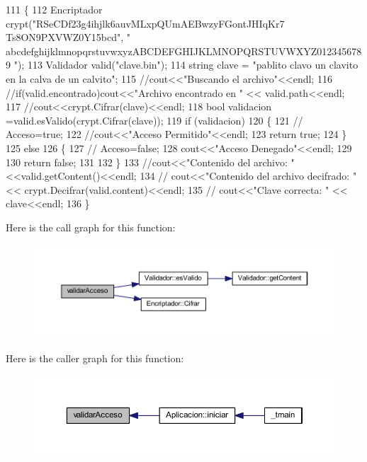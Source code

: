 \begin{DoxyCode}
111 \{
112     Encriptador crypt(\textcolor{stringliteral}{"RSeCDf23g4ihjlk6auvMLxpQUmAEBwzyFGontJHIqKr7 Ts8ON9PXVWZ0Y15bcd"}, \textcolor{stringliteral}{"
      abcdefghijklmnopqrstuvwxyzABCDEFGHIJKLMNOPQRSTUVWXYZ0123456789 "});
113     Validador valid(\textcolor{stringliteral}{"clave.bin"});
114     \textcolor{keywordtype}{string} clave = \textcolor{stringliteral}{"pablito clavo un clavito en la calva de un calvito"};
115     \textcolor{comment}{//cout<<"Buscando el archivo"<<endl;}
116     \textcolor{comment}{//if(valid.encontrado)cout<<"Archivo encontrado en " << valid.path<<endl;}
117     \textcolor{comment}{//cout<<crypt.Cifrar(clave)<<endl;}
118     \textcolor{keywordtype}{bool} validacion =valid.esValido(crypt.Cifrar(clave));
119     \textcolor{keywordflow}{if} (validacion)
120     \{
121         \textcolor{comment}{//      Acceso=true;}
122         \textcolor{comment}{//cout<<"Acceso Permitido"<<endl;}
123         \textcolor{keywordflow}{return} \textcolor{keyword}{true};
124     \}
125     \textcolor{keywordflow}{else}
126     \{
127         \textcolor{comment}{//      Acceso=false;}
128         cout<<\textcolor{stringliteral}{"Acceso Denegado"}<<endl;
129 
130         \textcolor{keywordflow}{return} \textcolor{keyword}{false};
131 
132     \}
133     \textcolor{comment}{//cout<<"Contenido del archivo: "<<valid.getContent()<<endl;}
134     \textcolor{comment}{//  cout<<"Contenido del archivo decifrado: " << crypt.Decifrar(valid.content)<<endl;}
135     \textcolor{comment}{//  cout<<"Clave correcta: " << clave<<endl;}
136 \}
\end{DoxyCode}


Here is the call graph for this function\-:\nopagebreak
\begin{figure}[H]
\begin{center}
\leavevmode
\includegraphics[width=350pt]{_encriptador_8h_a514eeb9d37c47513308d43f3ddcb5d66_cgraph}
\end{center}
\end{figure}




Here is the caller graph for this function\-:\nopagebreak
\begin{figure}[H]
\begin{center}
\leavevmode
\includegraphics[width=350pt]{_encriptador_8h_a514eeb9d37c47513308d43f3ddcb5d66_icgraph}
\end{center}
\end{figure}


